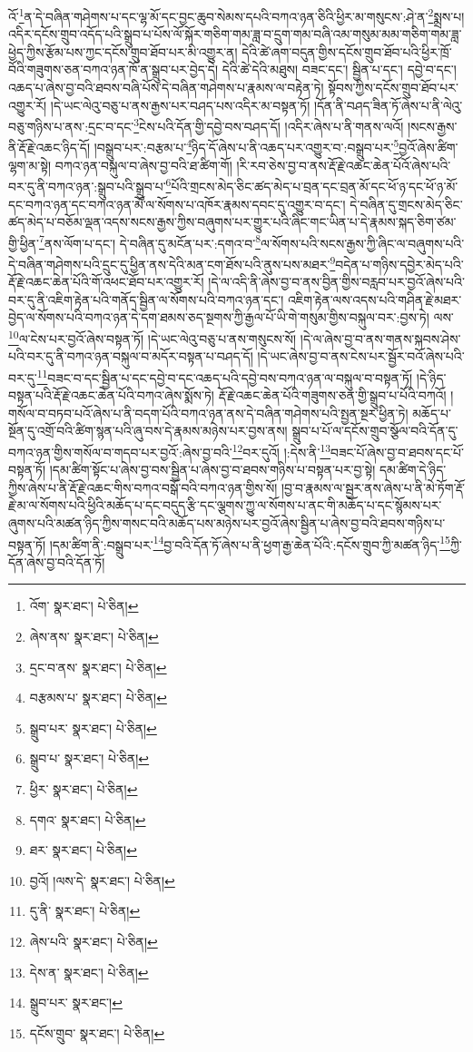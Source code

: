 འོ་\footnote{འོག་  སྣར་ཐང་།  པེ་ཅིན། }ན་དེ་བཞིན་གཤེགས་པ་དང་ལྷ་མོ་དང་བྱང་ཆུབ་སེམས་དཔའི་བཀའ་ཉན་ཅིའི་ཕྱིར་མ་གསུངས་:ཤེ་ན་\footnote{ཞེས་ནས་  སྣར་ཐང་།  པེ་ཅིན། }སྨྲས་པ། འདིར་དངོས་གྲུབ་འདོད་པའི་སྒྲུབ་པ་པོས་ལོ་སྐོར་གཅིག་གམ་ཟླ་བ་དྲུག་གམ་བཞི་འམ་གསུམ་མམ་གཅིག་གམ་ཟླ་ཕྱེད་ཀྱིས་རྩོམ་པས་ཀྱང་དངོས་གྲུབ་ཐོབ་པར་མི་འགྱུར་ན། དེའི་ཚེ་ཞག་བདུན་གྱིས་དངོས་གྲུབ་ཐོབ་པའི་ཕྱིར་ཁྲོ་བོའི་གཟུགས་ཅན་བཀའ་ཉན་ཁོ་ན་སྒྲུབ་པར་བྱེད་དེ། དེའི་ཚེ་དེའི་མཐུས། བཟང་དང་། སྦྱིན་པ་དང་། དབྱེ་བ་དང་། འཆད་པ་ཞེས་བྱ་བའི་ཐབས་བཞི་པོས་དེ་བཞིན་གཤེགས་པ་རྣམས་ལ་བརྟེན་ཏེ། སྟོབས་ཀྱིས་དངོས་གྲུབ་ཐོབ་པར་འགྱུར་རོ། །དེ་ཡང་ལེའུ་བཅུ་པ་ནས་རྒྱས་པར་བཤད་པས་འདིར་མ་བསྟན་ཏོ། །དོན་ནི་བཤད་ཟིན་ཏོ་ཞེས་པ་ནི་ལེའུ་བཅུ་གཉིས་པ་ནས་:དྲང་བ་དང་\footnote{དྲང་བ་ནས་  སྣར་ཐང་།  པེ་ཅིན། }ངེས་པའི་དོན་གྱི་དབྱེ་བས་བཤད་དོ། །འདིར་ཞེས་པ་ནི་གནས་ལའོ། །སངས་རྒྱས་ནི་རྡོ་རྗེ་འཆང་ཉིད་དོ། །བསྒྲུབ་པར་:བརྩམ་པ་\footnote{བརྩམས་པ་  སྣར་ཐང་།  པེ་ཅིན། }ཉིད་དོ་ཞེས་པ་ནི་འཆད་པར་འགྱུར་བ་:བསྒྲུབ་པར་\footnote{སྒྲུབ་པར་  སྣར་ཐང་།  པེ་ཅིན། }བྱའོ་ཞེས་ཚིག་ལྷག་མ་སྟེ། བཀའ་ཉན་བསྐུལ་བ་ཞེས་བྱ་བའི་ཐ་ཚིག་གོ། །རི་རབ་ཅེས་བྱ་བ་ནས་རྡོ་རྗེ་འཆང་ཆེན་པོའོ་ཞེས་པའི་བར་དུ་ནི་བཀའ་ཉན་:སྒྲུབ་པའི་སྒྲུབ་པ་\footnote{སྒྲུབ་པ་  སྣར་ཐང་།  པེ་ཅིན། }པོའི་གྲངས་མེད་ཅིང་ཚད་མེད་པ་བྲན་དང་བྲན་མོ་དང་ཕོ་ཉ་དང་ཕོ་ཉ་མོ་དང་བཀའ་ཉན་དང་བཀའ་ཉན་མོ་ལ་སོགས་པ་འཁོར་རྣམས་དབང་དུ་འགྱུར་བ་དང་། དེ་བཞིན་དུ་གྲངས་མེད་ཅིང་ཚད་མེད་པ་བཅོམ་ལྡན་འདས་སངས་རྒྱས་ཀྱིས་བཞུགས་པར་གྱུར་པའི་ཞིང་གང་ཡིན་པ་དེ་རྣམས་སྐད་ཅིག་ཙམ་གྱི་ཕྱིན་\footnote{ཕྱིར་  སྣར་ཐང་།  པེ་ཅིན། }ནས་ལོག་པ་དང་། དེ་བཞིན་དུ་མངོན་པར་:དགའ་བ་\footnote{དགའ་  སྣར་ཐང་།  པེ་ཅིན། }ལ་སོགས་པའི་སངས་རྒྱས་ཀྱི་ཞིང་ལ་བཞུགས་པའི་དེ་བཞིན་གཤེགས་པའི་དྲུང་དུ་ཕྱིན་ནས་དེའི་མན་ངག་ཐོས་པའི་ནུས་པས་མཐར་\footnote{ཐར་  སྣར་ཐང་།  པེ་ཅིན། }བདེན་པ་གཉིས་དབྱེར་མེད་པའི་རྡོ་རྗེ་འཆང་ཆེན་པོའི་གོ་འཕང་ཐོབ་པར་འགྱུར་རོ། །དེ་ལ་འདི་ནི་ཞེས་བྱ་བ་ནས་བྱིན་གྱིས་བརླབ་པར་བྱའོ་ཞེས་པའི་བར་དུ་ནི་འཇིག་རྟེན་པའི་གནོད་སྦྱིན་ལ་སོགས་པའི་བཀའ་ཉན་དང་། འཇིག་རྟེན་ལས་འདས་པའི་གཤིན་རྗེ་མཐར་བྱེད་ལ་སོགས་པའི་བཀའ་ཉན་དེ་དག་ཐམས་ཅད་སྔགས་ཀྱི་རྒྱལ་པོ་ཡི་གེ་གསུམ་གྱིས་བསྐུལ་བར་:བྱས་ཏེ། ལས་\footnote{བྱའོ། །ལས་དེ་  སྣར་ཐང་།  པེ་ཅིན། }ལ་ངེས་པར་བྱའོ་ཞེས་བསྟན་ཏོ། །དེ་ཡང་ལེའུ་བཅུ་པ་ནས་གསུངས་སོ། །དེ་ལ་ཞེས་བྱ་བ་ནས་གནས་སྐབས་ཤེས་པའི་བར་དུ་ནི་བཀའ་ཉན་བསྐུལ་བ་མདོར་བསྟན་པ་བཤད་དོ། །དེ་ཡང་ཞེས་བྱ་བ་ནས་ངེས་པར་སྦྱོར་བའོ་ཞེས་པའི་བར་དུ་\footnote{དུ་ནི་  སྣར་ཐང་།  པེ་ཅིན། }བཟང་བ་དང་སྦྱིན་པ་དང་དབྱེ་བ་དང་འཆད་པའི་དབྱེ་བས་བཀའ་ཉན་ལ་བསྐུལ་བ་བསྟན་ཏོ། །དེ་ཉིད་བསྟན་པའི་རྡོ་རྗེ་འཆང་ཆེན་པོའི་བཀའ་ཞེས་སྨོས་ཏེ། རྡོ་རྗེ་འཆང་ཆེན་པོའི་གཟུགས་ཅན་གྱི་སྒྲུབ་པ་པོའི་བཀའོ། །གསོལ་བ་བཏབ་པའོ་ཞེས་པ་ནི་བདག་པོའི་བཀའ་ཉན་ནས་དེ་བཞིན་གཤེགས་པའི་སྤྱན་སྔར་ཕྱིན་ཏེ། མཆོད་པ་སྔོན་དུ་འགྲོ་བའི་ཚིག་སྙན་པའི་ཞུ་བས་དེ་རྣམས་མཉེས་པར་བྱས་ནས། སྒྲུབ་པ་པོ་ལ་དངོས་གྲུབ་སྩོལ་བའི་དོན་དུ་བཀའ་ཉན་གྱིས་གསོལ་བ་གདབ་པར་བྱའོ་:ཞེས་བྱ་བའི་\footnote{ཞེས་པའི་  སྣར་ཐང་།  པེ་ཅིན། }བར་དུའོ། །:དེས་ནི་\footnote{དེས་ན་  སྣར་ཐང་།  པེ་ཅིན། }བཟང་པོ་ཞེས་བྱ་བ་ཐབས་དང་པོ་བསྟན་ཏོ། །དམ་ཚིག་སྟོང་པ་ཞེས་བྱ་བས་སྦྱིན་པ་ཞེས་བྱ་བ་ཐབས་གཉིས་པ་བསྟན་པར་བྱ་སྟེ། དམ་ཚིག་དེ་ཉིད་ཀྱིས་ཞེས་པ་ནི་རྡོ་རྗེ་འཆང་གིས་བཀའ་བསྒོ་བའི་བཀའ་ཉན་གྱིས་སོ། །བྱ་བ་རྣམས་ལ་སྦྱར་ནས་ཞེས་པ་ནི་མེ་ཏོག་རྡོ་རྗེ་མ་ལ་སོགས་པའི་ཕྱིའི་མཆོད་པ་དང་བདུད་རྩི་དང་ལྕགས་ཀྱུ་ལ་སོགས་པ་ནང་གི་མཆོད་པ་དང་སྙོམས་པར་ཞུགས་པའི་མཚན་ཉིད་ཀྱིས་གསང་བའི་མཆོད་པས་མཉེས་པར་བྱའོ་ཞེས་སྦྱིན་པ་ཞེས་བྱ་བའི་ཐབས་གཉིས་པ་བསྟན་ཏོ། །དམ་ཚིག་ནི་:བསྒྲུབ་པར་\footnote{སྒྲུབ་པར་  སྣར་ཐང་། }བྱ་བའི་དོན་ཏོ་ཞེས་པ་ནི་ཕྱག་རྒྱ་ཆེན་པོའི་:དངོས་གྲུབ་ཀྱི་མཚན་ཉིད་\footnote{དངོས་གྲུབ་  སྣར་ཐང་།  པེ་ཅིན། }ཀྱི་དོན་ཞེས་བྱ་བའི་དོན་ཏོ། 